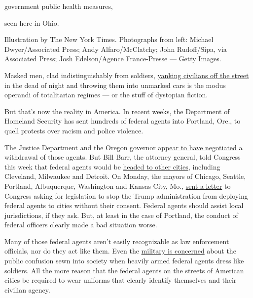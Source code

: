 government public health measures,

seen here in Ohio.

Illustration by The New York Times. Photographs from left: Michael
Dwyer/Associated Press; Andy Alfaro/McClatchy; John Rudoff/Sipa, via
Associated Press; Josh Edelson/Agence France-Presse --- Getty Images.

Masked men, clad indistinguishably from soldiers,
\href{https://www.nytimes3xbfgragh.onion/2020/07/17/us/politics/federal-agents-portland-arrests.html}{yanking
civilians off the street} in the dead of night and throwing them into
unmarked cars is the modus operandi of totalitarian regimes --- or the
stuff of dystopian fiction.

But that's now the reality in America. In recent weeks, the Department
of Homeland Security has sent hundreds of federal agents into Portland,
Ore., to quell protests over racism and police violence.

The Justice Department and the Oregon governor
\href{https://www.nytimes3xbfgragh.onion/2020/07/29/us/protests-portland-federal-withdrawal.html?action=click\&module=Top\%20Stories\&pgtype=Homepage}{appear
to have negotiated} a withdrawal of those agents. But Bill Barr, the
attorney general, told Congress this week that federal agents would be
\href{https://www.nytimes3xbfgragh.onion/reuters/2020/07/29/us/politics/29reuters-global-race-protests.html}{headed
to other cities}, including Cleveland, Milwaukee and Detroit. On Monday,
the mayors of Chicago, Seattle, Portland, Albuquerque, Washington and
Kansas City, Mo.,
\href{https://www.npr.org/sections/live-updates-protests-for-racial-justice/2020/07/27/895904023/mayors-demand-congress-block-trump-from-deploying-federal-agents-to-cities}{sent
a letter} to Congress asking for legislation to stop the Trump
administration from deploying federal agents to cities without their
consent. Federal agents should assist local jurisdictions, if they ask.
But, at least in the case of Portland, the conduct of federal officers
clearly made a bad situation worse.

Many of those federal agents aren't easily recognizable as law
enforcement officials, nor do they act like them. Even the
\href{https://www.washingtonpost.com/national-security/2020/07/22/cbp-military-camouflage-uniforms/}{military
is concerned} about the public confusion sewn into society when heavily
armed federal agents dress like soldiers. All the more reason that the
federal agents on the streets of American cities be required to wear
uniforms that clearly identify themselves and their civilian agency.

